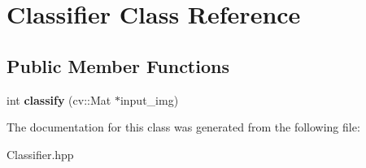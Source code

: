\hypertarget{class_classifier}{\section{Classifier Class Reference}
\label{class_classifier}
}
\subsection*{Public Member Functions}
\begin{DoxyCompactItemize}
\item 
\hypertarget{class_classifier_afd14ddf13364da1a9bd5b1e45eab9b3f}{int {\bfseries classify} (cv\+::\+Mat $\ast$input\+\_\+img)}\label{class_classifier_afd14ddf13364da1a9bd5b1e45eab9b3f}

\end{DoxyCompactItemize}


The documentation for this class was generated from the following file\+:\begin{DoxyCompactItemize}
\item 
Classifier.\+hpp\end{DoxyCompactItemize}
